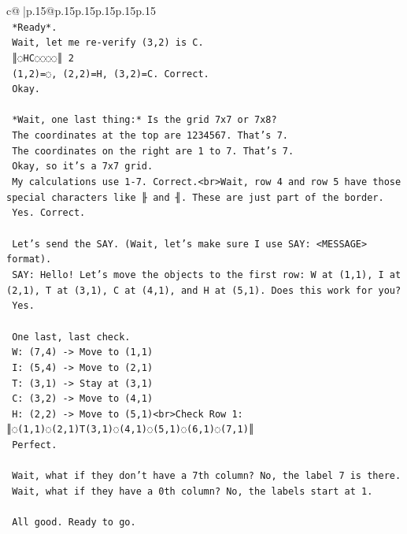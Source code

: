 \documentclass{article}
\begin{document}
{\begin{supertabular}{c@{$\;$}|p{.15\linewidth}@{}p{.15\linewidth}p{.15\linewidth}p{.15\linewidth}p{.15\linewidth}p{.15\linewidth}}
{{{\\ 
\texttt{    *Ready*.} \\
\texttt{    Wait, let me re{-}verify (3,2) is C.} \\
\texttt{    ║◌HC◌◌◌◌║ 2} \\
\texttt{    (1,2)=◌, (2,2)=H, (3,2)=C. Correct.} \\
\texttt{    Okay.} \\
\\ 
\texttt{    *Wait, one last thing:* Is the grid 7x7 or 7x8?} \\
\texttt{    The coordinates at the top are 1234567. That's 7.} \\
\texttt{    The coordinates on the right are 1 to 7. That's 7.} \\
\texttt{    Okay, so it's a 7x7 grid.} \\
\texttt{    My calculations use 1{-}7. Correct.<br>Wait, row 4 and row 5 have those special characters like ╟ and ╢. These are just part of the border.} \\
\texttt{    Yes. Correct.} \\
\\ 
\texttt{    Let's send the SAY. (Wait, let's make sure I use SAY: <MESSAGE> format).} \\
\texttt{    SAY: Hello! Let's move the objects to the first row: W at (1,1), I at (2,1), T at (3,1), C at (4,1), and H at (5,1). Does this work for you?} \\
\texttt{    Yes.} \\
\\ 
\texttt{    One last, last check.} \\
\texttt{    W: (7,4) {-}> Move to (1,1)} \\
\texttt{    I: (5,4) {-}> Move to (2,1)} \\
\texttt{    T: (3,1) {-}> Stay at (3,1)} \\
\texttt{    C: (3,2) {-}> Move to (4,1)} \\
\texttt{    H: (2,2) {-}> Move to (5,1)<br>Check Row 1: ║◌(1,1)◌(2,1)T(3,1)◌(4,1)◌(5,1)◌(6,1)◌(7,1)║} \\
\texttt{    Perfect.} \\
\\ 
\texttt{    Wait, what if they don't have a 7th column? No, the label 7 is there.} \\
\texttt{    Wait, what if they have a 0th column? No, the labels start at 1.} \\
\\ 
\texttt{    All good. Ready to go.} \\
}}}
\end{supertabular}}
\end{document}
